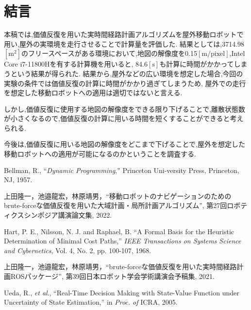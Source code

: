 \documentclass{jarticle}
\begin{document}
\section{結言}%
本稿では,価値反復を用いた実時間経路計画アルゴリズムを屋外移動ロボットで用い,屋外の実環境を走行させることで計算量を評価した.
結果としては,3714.98$\mathrm{[m^2]}$のフリースペースがある環境において,地図の解像度を0.15$\mathrm{[m/pixel]}$,Intel Core i7-11800Hを有する計算機を用いると,
84.6$\mathrm{[s]}$も計算に時間がかかってしまうという結果が得られた.
結果から,屋外などの広い環境を想定した場合,今回の実験の条件では価値反復の計算に時間がかかり過ぎてしまうため,
屋外での走行を想定した移動ロボットへの適用は適切ではないと言える.

しかし,価値反復に使用する地図の解像度をできる限り下げることで,離散状態数が小さくなるので,価値反復の計算に用いる時間を短くすることができると考えられる.

今後は,価値反復に用いる地図の解像度をどこまで下げることで,屋外を想定した移動ロボットへの適用が可能になるのかということを調査する.

\footnotesize
\begin{thebibliography}{99}

	Bellman, R., ``{\it Dynamic Programming},'' Princeton Uni-versity Press, Princeton, NJ, 1957.

	上田隆一，池邉龍宏，林原靖男，``移動ロボットのナビゲーションのためのbrute-forceな価値反復を用いた大域計画・局所計画アルゴリズム'', 
	第27回ロボティクスシンポジア講演論文集, 2022.
	
	Hart, P. E., Nilsson, N. J. and Raphael, B. ``A Formal
	Basis for the Heuristic Determination of Minimal Cost
	Paths,'' {\it IEEE Transactions on Systems Science and Cybernetics}, Vol. 4, No. 2, pp. 100-107, 1968.
	
	上田隆一，池邉龍宏，林原靖男，``brute-forceな価値反復を用いた実時間経路計画ROSパッケージ'', 
	第39回日本ロボット学会学術講演会予稿集, 2021.

	Ueda, R., {\it et al}., ``Real-Time Decision Making with State-Value Function under Uncertainty of State Estimation,''
	 in {\it Proc. of} ICRA, 2005.

\end{thebibliography}

\normalsize
\end{document}
